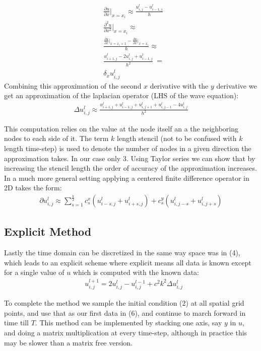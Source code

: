 \documentclass[conference]{IEEEtran}
\begin{document}
\begin{align}
    \nonumber&\frac{\partial u}{\partial x}\bigg\rvert_{x=x_i} \approx \frac{u^l_{i,j} - u^l_{i-1,j}}{h}\\
    \nonumber&\frac{\partial^2u}{\partial x^2}\bigg\rvert_{x=x_i}\approx\\ \nonumber&\frac{\frac{\partial u}{\partial x}\big\rvert_{x=x_i+1} - \frac{\partial u}{\partial x}\big\rvert_{x=x_i}}{h} \approx\\
    &\frac{u^l_{i+1,j} - 2u^l_{i,j} + u^l_{i-1,j}}{h^2}\ = \\
    & \delta_x u^l_{i,j}
\end{align}
Combining this approximation of the second $x$ derivative with the $y$ derivative we get an approximation of the laplacian operator (LHS of the wave equation):
\begin{align}
    \Delta u^l_{i,j} \approx \frac{u^l_{i+1,j} + u^l_{i-1,j} + u^l_{i,j+1} + u^l_{i,j-1} - 4u^l_{i,j} }{h^2}
\end{align}

This computation relies on the value at the node itself an a the neighboring nodes to each side of it. The term $k$ length stencil (not to be confused with $k$ length time-step) is used to denote the number of nodes in a given direction the approximation takes. In our case only 3. Using Taylor series we can show that by increasing the stencil length the order of accuracy of the approximation increases. In a much more general setting applying a centered finite difference operator in 2D takes the form:
\begin{align}
    \partial u^l_{i,j} \approx \sum_{s=1}^{\frac{k}{2}} c^x_s(u^l_{i-s,j} + u^l_{i+s,j}) + c^y_s(u^l_{i,j-s} + u^l_{i,j+s})
\end{align}


\subsection{Explicit Method}

Lastly the time domain can be discretized in the same way space was in (4), which leads to an explicit scheme where explicit means all data is known except for a single value of $u$ which is computed with the known data:
\begin{align}
&u^{l+1}_{i,j} = 2 u^l_{i,j} - u^{l-1}_{i,j} + c^2k^2\Delta u^l_{i,j}
\end{align}

To complete the method we sample the initial condition (2) at all spatial grid points, and use that as our first data in (6), and continue to march forward in time till $T$. This method can be implemented by stacking one axis, say $y$ in $u$, and doing a matrix multiplication at every time-step, although in practice this may be slower than a matrix free version.
\end{document}
